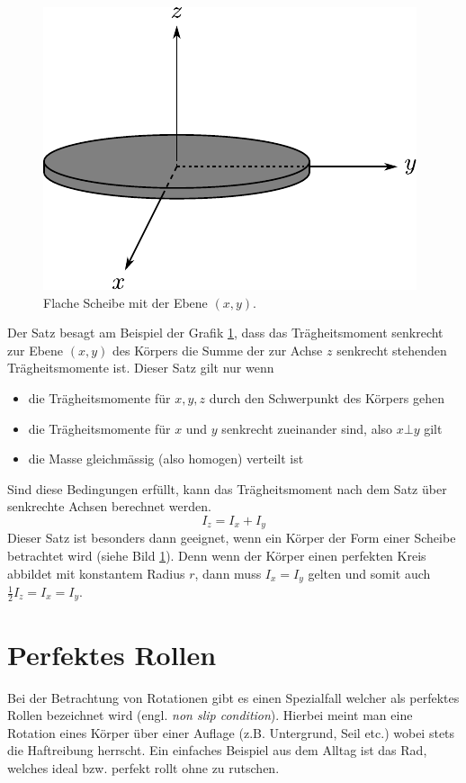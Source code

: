 \begin{figure}[h!]
	\centering
	\includegraphics[scale=0.8]{../fig/steiner2.pdf}
	\caption{Flache Scheibe mit der Ebene $(x,y)$.}
	\label{fig:steiner2}
\end{figure}

\noindent
Der Satz besagt am Beispiel der Grafik \ref{fig:steiner2}, 
dass das Trägheitsmoment senkrecht zur Ebene $(x,y)$ des 
Körpers die Summe der zur Achse $z$ senkrecht stehenden Trägheitsmomente 
ist. Dieser Satz gilt nur wenn
\begin{itemize}
	\item die Trägheitsmomente für $x,y,z$ durch den Schwerpunkt des 
		Körpers gehen
	\item die Trägheitsmomente für $x$ und $y$ senkrecht zueinander 
		sind, also $x \bot y$ gilt
	\item die Masse gleichmässig (also homogen) verteilt ist
\end{itemize}
Sind diese Bedingungen erfüllt, kann das Trägheitsmoment nach dem Satz
über senkrechte Achsen berechnet werden.
\[ \boxed{I_z = I_x + I_y} \]
Dieser Satz ist besonders dann geeignet, wenn ein Körper der Form einer
Scheibe betrachtet wird (siehe Bild \ref{fig:steiner2}). 
Denn wenn der Körper einen perfekten Kreis abbildet mit konstantem 
Radius $r$, dann muss $I_x = I_y$ gelten und somit auch 
$\frac{1}{2} I_z = I_x = I_y$.

\newpage
\section{Perfektes Rollen}\label{sec:non-slip}
Bei der Betrachtung von Rotationen gibt es einen Spezialfall welcher
als perfektes Rollen bezeichnet wird (engl. \textit{non slip condition}).
Hierbei meint man eine Rotation eines Körper über einer Auflage (z.B. 
Untergrund, Seil etc.) wobei stets die Haftreibung herrscht. 
Ein einfaches Beispiel aus dem Alltag ist das Rad, welches ideal bzw. 
perfekt rollt ohne zu rutschen.

